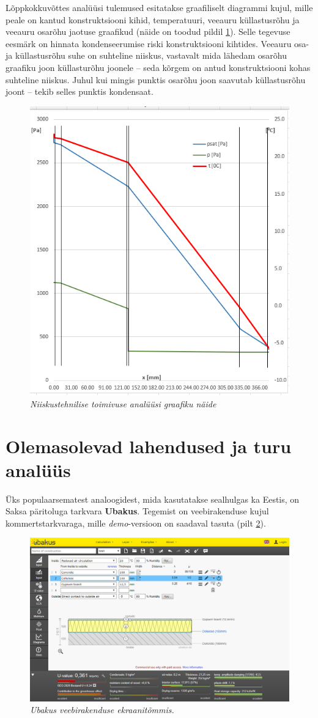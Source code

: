 Lõppkokkuvõttes analüüsi tulemused esitatakse graafiliselt diagrammi kujul, mille peale on kantud konstruktsiooni 
kihid, temperatuuri, veeauru küllastusrõhu ja veeauru osarõhu jaotuse graafikud (näide on toodud pildil \ref{fig:excel_graph_sample}). 
Selle tegevuse eesmärk on hinnata kondenseerumise riski konstruktsiooni kihtides. Veeauru osa- ja küllastusrõhu 
suhe on suhteline niiskus, vastavalt mida lähedam osarõhu graafiku joon küllasturõhu joonele -- seda kõrgem on 
antud konstruktsiooni kohas suhteline niiskus. Juhul kui mingis punktis osarõhu joon saavutab küllastusrõhu 
joont -- tekib selles punktis kondensaat. 

\begin{figure}[ht]
    \centering
    \includegraphics[width=.6\textwidth]{figures/01_analogues/05_excel_grafic_sample.png}
    \caption{\textit{Niiskustehnilise toimivuse analüüsi graafiku näide}}
    \label{fig:excel_graph_sample}
\end{figure}



\section{Olemasolevad lahendused ja turu analüüs}
Üks populaarsematest analoogidest, mida kasutatakse sealhulgas ka Eestis, on Saksa päritoluga tarkvara \textbf{Ubakus}. 
Tegemist on veebirakenduse kujul kommertstarkvaraga, mille \textit{demo}-versioon on saadaval tasuta (pilt \ref{fig:ubakus_sample}). 
\begin{figure}[ht]
    \centering
    \includegraphics[width=.8\textwidth]{figures/01_analogues/01_ubakus.png}
    \caption{\textit{Ubakus veebirakenduse ekraanitõmmis.}}
    \label{fig:ubakus_sample}
\end{figure}

